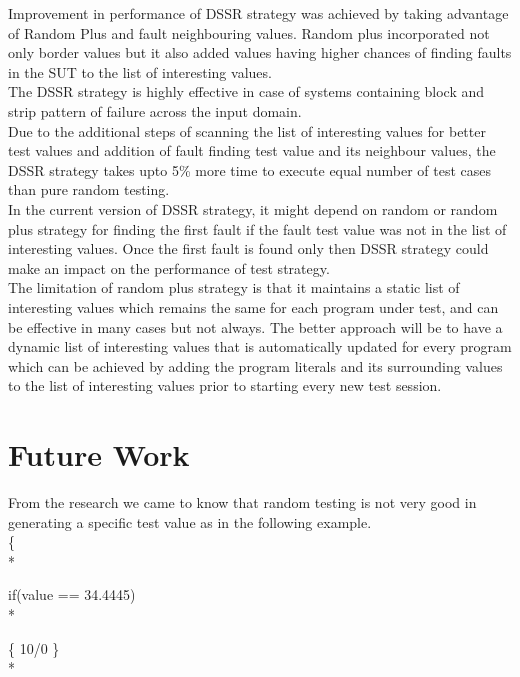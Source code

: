 \documentclass[10pt, conference, compsocconf]{IEEEtran}
\begin{document}
Improvement in performance of DSSR strategy was achieved by taking advantage of Random Plus and fault neighbouring values. Random plus incorporated not only border values but it also added values having higher chances of finding faults in the SUT to the list of interesting values.\\

The DSSR strategy is highly effective in case of systems containing block and strip pattern of failure across the input domain.\\

Due to the additional steps of scanning the list of interesting values for better test values and addition of fault finding test value and its neighbour values, the DSSR strategy takes upto 5\% more time to execute equal number of test cases than pure random testing. \\

In the current version of DSSR strategy, it might depend on random or random plus strategy for finding the first fault if the fault test value was not in the list of interesting values. Once the first fault is found only then DSSR strategy could make an impact on the performance of test strategy.\\

The limitation of random plus strategy is that it maintains a static list of interesting values which remains the same for each program under test, and can be effective in many cases but not always. The better approach will be to have a dynamic list of interesting values that is automatically updated for every program which can be achieved by adding the program literals and its surrounding values to the list of interesting values prior to starting every new test session.


\section{Future Work}

From the research we came to know that random testing is not very good in generating a specific test value as in the following example.  \\

\{ \\*   

\hspace{07 mm}if(value == 34.4445) \\*

\hspace{07 mm}\{ 10/0 \} \\* 
\end{document}
